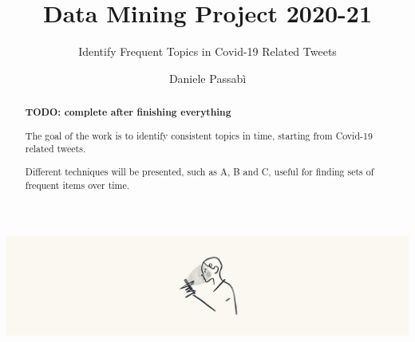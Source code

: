 \documentclass[sigconf,edbt]{acmart-edbt2021}
\begin{document}
\title{Data Mining Project 2020-21}
\subtitle{Identify Frequent Topics in Covid-19 Related Tweets}


\author{Daniele Passabì}


\begin{abstract}

  \begin{center}
    \textbf{TODO: complete after finishing everything}
  \end{center}

  The goal of the work is to identify consistent topics in time, starting from Covid-19 related tweets. 

  Different techniques will be presented, such as A, B and C, useful for finding sets of frequent items over time.
\end{abstract}


\begin{teaserfigure}
  \includegraphics[width=\textwidth]{man_on_the_phone.png}
  \label{fig:teaser}
\end{teaserfigure}

\maketitle





\end{document}

